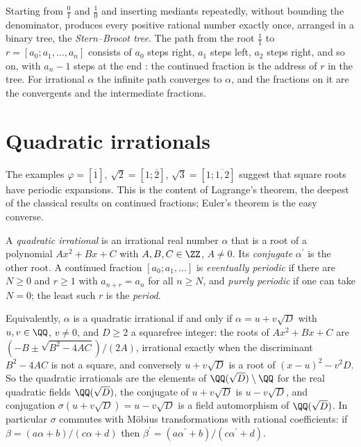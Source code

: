 \begin{remark}\label{continued-fractions:remark-stern-brocot}
Starting from $\frac01$ and $\frac10$ and inserting mediants repeatedly, without bounding the denominator, produces every positive rational number exactly once, arranged in a binary tree, the
\emph{Stern--Brocot tree}. The path from the root $\frac11$ to $r = [a_0; a_1, \ldots, a_n]$ consists of $a_0$ steps right, $a_1$ steps left, $a_2$ steps right, and so on, with $a_n - 1$ steps at the
end \cite[Chapter 4]{graham-knuth-patashnik}: the continued fraction is the address of $r$ in the tree. For irrational $\alpha$ the infinite path converges to $\alpha$, and the fractions on it are
the convergents and the intermediate fractions.
\end{remark}

\section{Quadratic irrationals}\label{continued-fractions:section-quadratic}

The examples $\varphi = [\overline{1}]$, $\sqrt2 = [1; \overline{2}]$, $\sqrt3 = [1; \overline{1, 2}]$ suggest that square roots have periodic expansions. This is the content of Lagrange's theorem,
the deepest of the classical results on continued fractions; Euler's theorem is the easy converse.

\begin{definition}\label{continued-fractions:definition-quadratic-irrational}
A \emph{quadratic irrational} is an irrational real number $\alpha$ that is a root of a polynomial $Ax^2 + Bx + C$ with $A, B, C \in \ZZ$, $A \neq 0$. Its \emph{conjugate} $\alpha^{\prime}$ is the
other root. A continued fraction $[a_0; a_1, \ldots]$ is \emph{eventually periodic} if there are $N \geq 0$ and $r \geq 1$ with $a_{n+r} = a_n$ for all $n \geq N$, and \emph{purely periodic} if one
can take $N = 0$; the least such $r$ is the \emph{period}.
\end{definition}

Equivalently, $\alpha$ is a quadratic irrational if and only if $\alpha = u + v\sqrt D$ with $u, v \in \QQ$, $v \neq 0$, and $D \geq 2$ a squarefree integer: the roots of $Ax^2 + Bx + C$ are
$(-B \pm \sqrt{B^2 - 4AC})/(2A)$, irrational exactly when the discriminant $B^2 - 4AC$ is not a square, and conversely $u + v\sqrt D$ is a root of $(x - u)^2 - v^2D$. So the quadratic irrationals are
the elements of $\QQ(\sqrt D) \setminus \QQ$ for the real quadratic fields $\QQ(\sqrt D)$, the conjugate of $u + v\sqrt D$ is $u - v\sqrt D$, and conjugation $\sigma(u + v\sqrt D) = u - v\sqrt D$ is a field
automorphism of $\QQ(\sqrt D)$. In particular $\sigma$ commutes with Möbius transformations with rational coefficients: if $\beta = (a\alpha + b)/(c\alpha + d)$ then
$\beta^{\prime} = (a\alpha^{\prime} + b)/(c\alpha^{\prime} + d)$.

